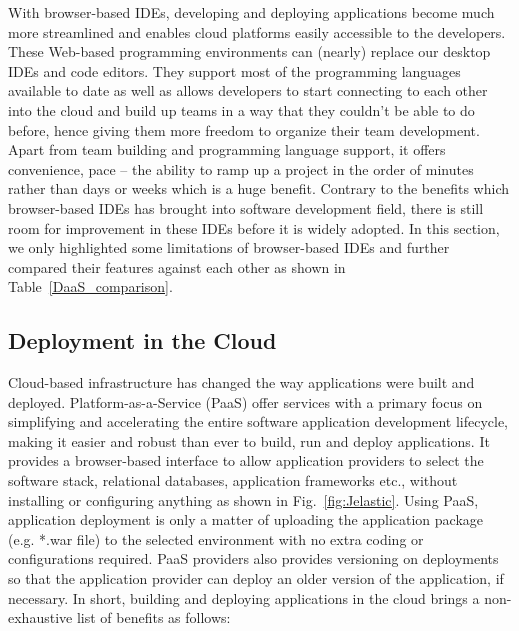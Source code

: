 \documentclass[11pt,fleqn,twoside]{article}
\begin{document}
With browser-based IDEs, developing and deploying applications become much more streamlined and enables cloud platforms easily accessible to the developers. These Web-based programming environments can (nearly) replace our desktop IDEs and code editors. They support most of the programming languages available to date as well as allows developers to start connecting to each other into the cloud and build up teams in a way that they couldn't be able to do before, hence giving them more freedom to organize their team development. Apart from team building and programming language support, it offers convenience, pace -- the ability to ramp up a project in the order of minutes rather than days or weeks which is a huge benefit. Contrary to the benefits which browser-based IDEs has brought into software development field, there is still room for improvement in these IDEs before it is widely adopted. In this section, we only highlighted some limitations of browser-based IDEs and further compared their features against each other as shown in Table~\ref{DaaS_comparison}.


\subsection{Deployment in the Cloud}

Cloud-based infrastructure has changed the way applications were built and deployed. Platform-as-a-Service (PaaS) offer services with a primary focus on simplifying and accelerating the entire software application development lifecycle, making it easier and robust than ever to build, run and deploy applications. It provides a browser-based interface to allow application providers to select the software stack, relational databases, application frameworks etc., without installing or configuring anything as shown in Fig.~\ref{fig:Jelastic}. Using PaaS, application deployment is only a matter of uploading the application package (e.g. *.war file) to the selected environment with no extra coding or configurations required. PaaS providers also provides versioning on deployments so that the application provider can deploy an older version of the application, if necessary. In short, building and deploying applications in the cloud brings a  non-exhaustive list of benefits as follows:
\end{document}

